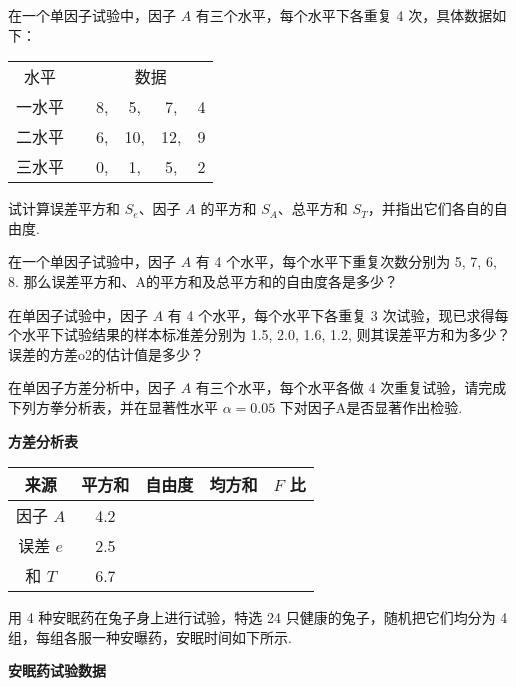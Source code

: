 \begin{xiti}
    \item 在一个单因子试验中，因子 $A$ 有三个水平，每个水平下各重复 4 次，具体数据如下：
    \begin{center}
      \begin{tabular}{cccccc}
        水平    &       & \multicolumn{4}{c}{数据} \\
        一水平   &       & 8,    & 5,    & 7,    & 4 \\
        二水平   &       & 6,    & 10,   & 12,   & 9 \\
        三水平   &       & 0,    & 1,    & 5,    & 2 \\
      \end{tabular}%
    \end{center}
    试计算误差平方和 $S_e$、因子 $A$ 的平方和 $S_A$、总平方和 $S_T$，并指出它们各自的自由度.
    \item 在一个单因子试验中，因子 $A$ 有 4 个水平，每个水平下重复次数分别为 5, 7, 6, 8. 那么误差平方和、A的平方和及总平方和的自由度各是多少？
    \item 在单因子试验中，因子 $A$ 有 4 个水平，每个水平下各重复 3 次试验，现已求得每个水平下试验结果的样本标准差分别为 1.5, 2.0, 1.6, 1.2, 则其误差平方和为多少？误差的方差o2的估计值是多少？
    \item 在单因子方差分析中，因子 $A$ 有三个水平，每个水平各做 4 次重复试验，请完成下列方拳分析表，并在显著性水平 $\alpha=0.05$ 下对因子A是否显著作出检验.
    \begin{center}
      \textbf{方差分析表}\\[1ex]
      \begin{tabular}{ccccc}
        \toprule
        来源    & 平方和 & 自由度 &均方和 & $F$ 比 \\
        \midrule
        因子 $A$   & 4.2   &       &       &  \\
        误差 $e$  & 2.5   &       &       &  \\
        和 $T$   & 6.7   &       &       &  \\
        \bottomrule
        \end{tabular}%
    \end{center}
    \item 用 4 种安眠药在兔子身上进行试验，特选 24 只健康的兔子，随机把它们均分为 4 组，每组各服一种安曝药，安眠时间如下所示.
    \begin{center}
      \textbf{安眠药试验数据}\\[1ex]

\end{center}
\end{xiti}
